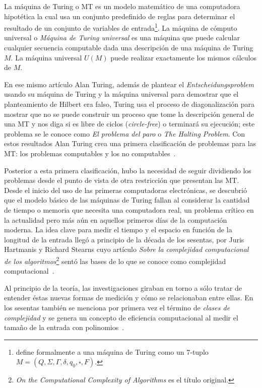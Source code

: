 La máquina de Turing o MT es un modelo matemático de una computadora hipotética
la cual usa un conjunto predefinido de reglas para determinar el resultado de
un conjunto de variables de entrada\footnote{\cite{gurovich2015introduccion}
define formalmente a una máquina de Turing como un 7-tuplo $M=(Q,\Sigma, \Gamma,
\delta, q_{0}, \square,F)$.}. La máquina de cómputo universal o \textit{Máquina
de Turing universal} es una máquina que puede calcular cualquier secuencia
computable dada una descripción de una máquina de Turing $M$. La máquina universal $U(M)$
puede realizar exactamente los mismos cálculos de $M$.

En ese mismo artículo Alan Turing, además de plantear el \emph{Entscheidungsproblem}
usando su máquina de Turing y la máquina universal para demostrar que el
planteamiento de Hilbert era falso, Turing usa el proceso de diagonalización para
mostrar que no se puede construir un proceso que tome la descripción general de
una MT y nos diga si es libre de ciclos (\textit{circle-free}) o terminará su
ejecución; este problema se le conoce como \textit{El problema del paro} o
\textit{The Halting Problem}. Con estos resultados Alan Turing crea una primera
clasificación de problemas para las MT: los problemas computables y los no
computables~\cite{Turing1936}.

Posterior a esta primera clasificación, hubo la necesidad de seguir dividiendo
los problemas desde el punto de vista de otra restricción que presentan las MT.
Desde el inicio del uso de las primeras computadoras electrónicas, se
descubrió que el modelo básico de las máquinas de Turing fallan al considerar
la cantidad de tiempo o memoria que necesita una computadora real, un
problema crítico en la actualidad pero más aún en aquellos primeros días de
la computación moderna. La idea clave para medir el tiempo y el espacio en función
de la longitud de la entrada llegó a principio de la década de los sesentas,
por Juris Hartmanis y Richard Stearns cuyo artículo \textit{Sobre la complejidad
computacional de los algoritmos}\footnote{\textit{On the Computational
Complexity of Algorithms} es el título original.} sentó las bases de lo que
se conoce como complejidad computacional~\cite{Hartmanis1965}.

Al principio de la teoría, las investigaciones giraban en torno a
sólo tratar de entender éstas nuevas formas de medición y cómo se
relacionaban entre ellas. En los sesentas también se menciona por primera vez el
término de \textit{clases de complejidad} y se genera un concepto de eficiencia
computacional al medir el tamaño de la entrada con polinomios~\cite{Fortnow2002}.

